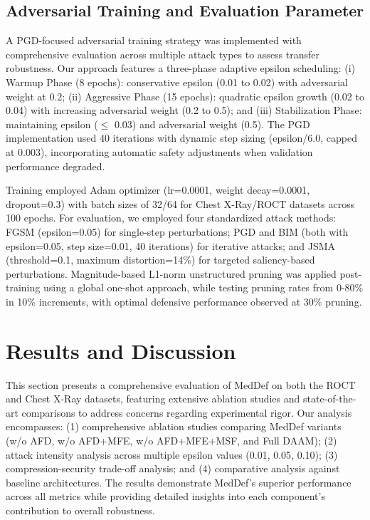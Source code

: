 \documentclass[preprint,12pt]{elsarticle}
\begin{document}
\subsection{Adversarial Training and Evaluation Parameter}
A PGD-focused adversarial training strategy was implemented with comprehensive evaluation across multiple attack types to assess transfer robustness. Our approach features a three-phase adaptive epsilon scheduling: (i) Warmup Phase (8 epochs): conservative epsilon (0.01 to 0.02) with adversarial weight at 0.2; (ii) Aggressive Phase (15 epochs): quadratic epsilon growth (0.02 to 0.04) with increasing adversarial weight (0.2 to 0.5); and (iii) Stabilization Phase: maintaining epsilon ($\leq$ 0.03) and adversarial weight (0.5). The PGD implementation used 40 iterations with dynamic step sizing (epsilon/6.0, capped at 0.003), incorporating automatic safety adjustments when validation performance degraded.

Training employed Adam optimizer (lr=0.0001, weight decay=0.0001, dropout=0.3) with batch sizes of 32/64 for Chest X-Ray/ROCT datasets across 100 epochs. For evaluation, we employed four standardized attack methods: FGSM (epsilon=0.05) for single-step perturbations; PGD and BIM (both with epsilon=0.05, step size=0.01, 40 iterations) for iterative attacks; and JSMA (threshold=0.1, maximum distortion=14\%) for targeted saliency-based perturbations. Magnitude-based L1-norm unstructured pruning was applied post-training using a global one-shot approach, while testing pruning rates from 0-80\% in 10\% increments, with optimal defensive performance observed at 30\% pruning.

\section{Results and Discussion}
\label{sec:results}

This section presents a comprehensive evaluation of MedDef on both the ROCT and Chest X-Ray datasets, featuring extensive ablation studies and state-of-the-art comparisons to address concerns regarding experimental rigor. Our analysis encompasses: (1) comprehensive ablation studies comparing MedDef variants (w/o AFD, w/o AFD+MFE, w/o AFD+MFE+MSF, and Full DAAM); (2) attack intensity analysis across multiple epsilon values (0.01, 0.05, 0.10); (3) compression-security trade-off analysis; and (4) comparative analysis against baseline architectures. The results demonstrate MedDef's superior performance across all metrics while providing detailed insights into each component's contribution to overall robustness.
\end{document}
